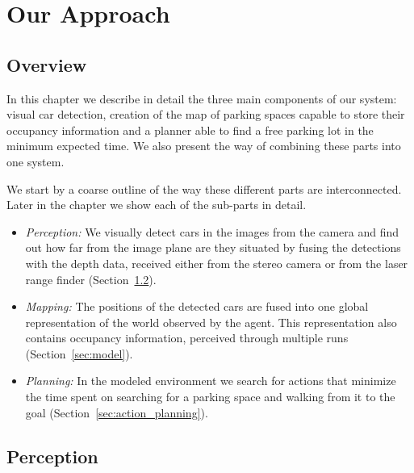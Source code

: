 
\newcommand\Bx{x}
\newcommand\Bm{m}
\def\v{\vm{v}}
\newcommand\vm[1]{\bm{\mathrm{#1}}}
\renewcommand{\v}{{\mbox{a}^i}}
\newcommand{\z}{z_{t}}
\newcommand{\y}{z_{1:t-1}}

\chapter{Our Approach}
\label{cha:our_approach}

\section{Overview} %
\label{sec:overview}

In this chapter we describe in detail the three main components of our system:
visual car detection, creation of the map of parking spaces capable to store
their occupancy information and a planner able to find a free parking lot in
the minimum expected time. We also present the way of combining these parts
into one system.

We start by a coarse outline of the way these different parts are
interconnected. Later in the chapter we show each of the sub-parts in detail.

\begin{itemize}

\item \emph{Perception:} We visually detect cars in the images from the camera and find out how far from the image plane are they situated by fusing the detections with the depth data, received either from the stereo camera or from the laser range finder (Section~\ref{sec:perception}).

\item \emph{Mapping:} The positions of the detected cars are fused into one global representation of the world observed by the agent. This representation also contains occupancy information, perceived through multiple runs (Section~\ref{sec:model}).

\item \emph{Planning:} In the modeled environment we search for actions that minimize the time spent on searching for a parking space and walking from it to the goal (Section~\ref{sec:action_planning}).

\end{itemize}


\section{Perception} %
\label{sec:perception}

